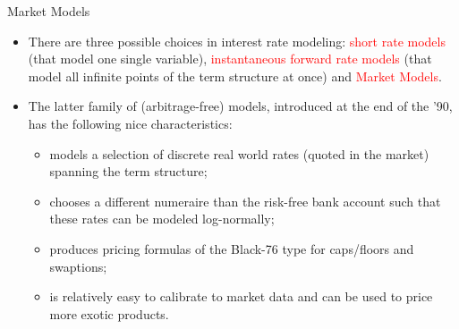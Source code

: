\documentclass{beamer}
\begin{document}
\begin{frame}{Market Models}
  \begin{itemize}
  \item<1-> There are three possible choices in interest rate modeling: \textcolor{red}{short rate models} (that model one single variable), \textcolor{red}{instantaneous forward rate models} (that model all infinite points of the term structure at once) and \textcolor{red}{Market Models}.
  \item<2-> The latter family of (arbitrage-free) models, introduced at the end of the '90, has the following nice characteristics:
    \begin{itemize}
    \item<3-> models a selection of discrete real world rates (quoted in the market) spanning the term structure;
    \item<4-> chooses a different numeraire than the risk-free bank account such that these rates can be modeled log-normally;
    \item<5-> produces pricing formulas of the Black-76 type for caps/floors and swaptions;
    \item<6-> is relatively easy to calibrate to market data and can be used to price more exotic products.
    \end{itemize}
  \end{itemize}
\end{frame}
\end{document}

